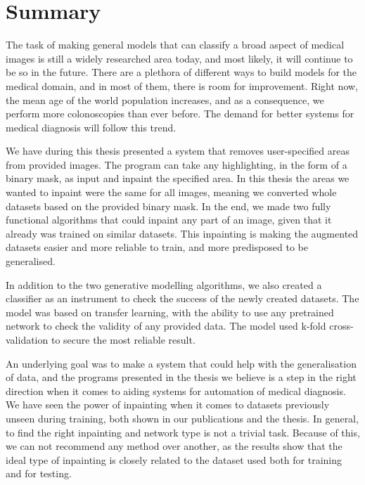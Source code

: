 \section{Summary}
The task of making general models that can classify a broad aspect of medical images is still a widely researched area today, and most likely, it will continue to be so in the future. There are a plethora of different ways to build models for the medical domain, and in most of them, there is room for improvement. Right now, the mean age of the world population increases, and as a consequence, we perform more colonoscopies than ever before. The demand for better systems for medical diagnosis will follow this trend.

We have during this thesis presented a system that removes user-specified areas from provided images. The program can take any highlighting, in the form of a binary mask, as input and inpaint the specified area. In this thesis the areas we wanted to inpaint were the same for all images, meaning we converted whole datasets based on the provided binary mask. In the end, we made two fully functional algorithms that could inpaint any part of an image, given that it already was trained on similar datasets.
This inpainting is making the augmented datasets easier and more reliable to train, and more predisposed to be generalised.

In addition to the two generative modelling algorithms, we also created a classifier as an instrument to check the success of the newly created datasets. The model was based on transfer learning, with the ability to use any pretrained network to check the validity of any provided data. The model used k-fold cross-validation to secure the most reliable result.

An underlying goal was to make a system that could help with the generalisation of data, and the programs presented in the thesis we believe is a step in the right direction when it comes to aiding systems for automation of medical diagnosis.
We have seen the power of inpainting when it comes to datasets previously unseen during training, both shown in our publications and the thesis.
In general, to find the right inpainting and network type is not a trivial task. Because of this, we can not recommend any method over another, as the results show that the ideal type of inpainting is closely related to the dataset used both for training and for testing.

